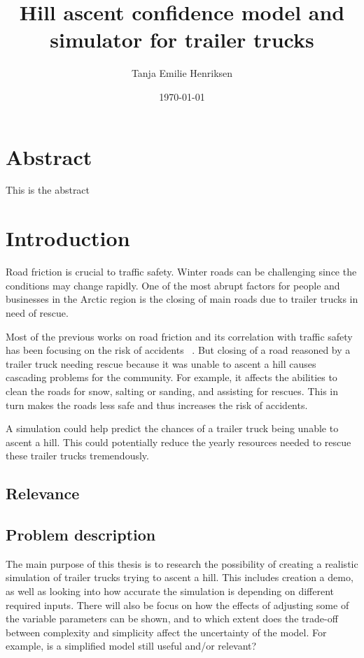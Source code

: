 \documentclass[a4,10pt]{article}
\title{Hill ascent confidence model and simulator for trailer trucks}
\author{Tanja Emilie Henriksen}
\date{\today}
\begin{document}
\maketitle


\pagebreak
\section*{Abstract}
This is the abstract


 
\pagebreak
\tableofcontents
\listoffigures
\listoftables

\pagebreak
\section{Introduction}
Road friction is crucial to traffic safety. Winter roads can be challenging since the conditions may change rapidly. One of the most abrupt factors for people and businesses in the Arctic region is the closing of main roads due to trailer trucks in need of rescue. 
\par 
Most of the previous works on road friction and its correlation with traffic safety has been focusing on the risk of accidents ~\citep{Friction}. But closing of a road reasoned by a trailer truck needing rescue because it was unable to ascent a hill causes cascading problems for the community. For example, it affects the abilities to clean the roads for snow, salting or sanding, and assisting for rescues. This in turn makes the roads less safe and thus increases the risk of accidents.
\par
A simulation could help predict the chances of a trailer truck being unable to ascent a hill. This could potentially reduce the yearly resources needed to rescue these trailer trucks tremendously. 

\subsection{Relevance}


\subsection{Problem description}
The main purpose of this thesis is to research the possibility of creating a realistic simulation of trailer trucks trying to ascent a hill. This includes creation a demo, as well as looking into how accurate the simulation is depending on different required inputs. There will also be focus on how the effects of adjusting some of the variable parameters can be shown, and to which extent does the trade-off between complexity and simplicity affect the uncertainty of the model. For example, is a simplified model still useful and/or relevant?
\end{document}
